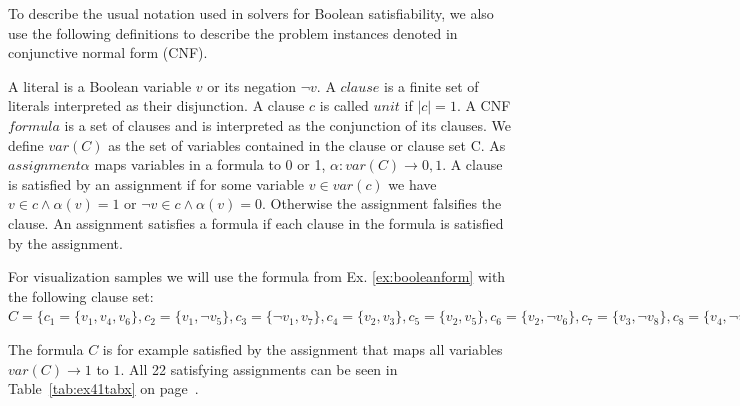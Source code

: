 \documentclass[a4paper, 12pt, bibliography=totoc]{scrartcl}
\begin{document}
To describe the usual notation used in solvers for Boolean satisfiability, we also use the following definitions to describe the problem instances denoted in conjunctive normal form (CNF).

A literal is a Boolean variable $v$ or its negation $\neg v$. A $clause$ is a finite set of literals interpreted as their disjunction. A clause $c$ is called $unit$ if $|c|=1$. A CNF $formula$ is a set of clauses and is interpreted as the conjunction of its clauses. We define $var(C)$ as the set of variables contained in the clause or clause set C. As $assignment \alpha$ maps variables in a formula to 0 or 1, $\alpha : var(C)\rightarrow 0,1$. A clause is satisfied by an assignment if for some variable $v \in var(c)$ we have $v \in c \land \alpha (v)=1$ {or} $\neg v \in c \land \alpha(v)=0$. Otherwise the assignment falsifies the clause. An assignment satisfies a formula if each clause in the formula is satisfied by the assignment. \\
\begin{example}\label{ex:example41}
	For visualization samples we will use the formula from Ex. \ref{ex:booleanform} with the following clause set: $C=\{c_{1}=\{v_{1},v_{4},v_{6}\},
	c_{2}=\{v_{1},\neg v_{5}\},
	c_{3}=\{\neg v_{1},v_{7}\},
	c_{4}=\{v_{2},v_{3}\},
	c_{5}=\{v_{2},v_{5}\},
	c_{6}=\{v_{2},\neg v_{6}\},
	c_{7}=\{v_{3},\neg v_{8}\},
	c_{8}=\{v_{4},\neg v_{8}\},
	c_{9}=\{\neg v_{4},v_{6}\},
	c_{10}=\{\neg v_{4},v_{7}\}\}$
\end{example}
\vskip 12pt
The formula $C$ is for example satisfied by the assignment that maps all variables $var(C)\rightarrow 1$ to $1$. 
All 22 satisfying assignments can be seen in Table~\ref{tab:ex41tabx} on page~\pageref{tab:ex41tabx}.
\end{document}
